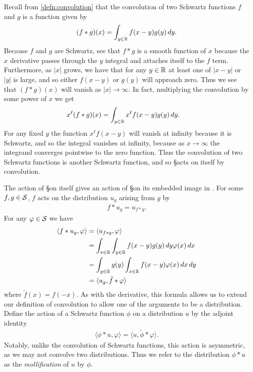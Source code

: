     Recall from \cref{defn:convolution} that the convolution of two Schwartz functions $f$ and $g$ is a function given by
    \begin{align*}
      (f*g)(x) = \int_{y\in\R} f(x-y)g(y)\,dy \text{.}
    \end{align*}
    Because $f$ and $g$ are Schwartz, see that $f*g$ is a smooth function of $x$ because the $x$ derivative passes through the $y$ integral and attaches itself to the $f$ term.
    Furthermore, as $|x|$ grows, we have that for any $y\in\R$ at least one of $|x-y|$ or $|y|$ is large, and so either $f(x-y)$ or $g(y)$ will approach zero.
    Thus we see that $(f*g)(x)$ will vanish as $|x|\rightarrow\infty$.
    In fact, multiplying the convolution by some power of $x$ we get
    \begin{align*}
      x^\ell(f*g)(x)
      &= \int_{y\in\R} x^\ell f(x-y)g(y)\,dy \text{.}
    \end{align*}
    For any fixed $y$ the function $x^\ell f(x-y)$ will vanish at infinity because it is Schwartz, and so the integral vanishes at infinity, because as $x\rightarrow\infty$ the integrand converges pointwise to the zero function.
    Thus the convolution of two Schwartz functions is another Schwartz function, and so \S acts on itself by convolution.

    The action of \S on itself gives an action of \S on its embedded image in \SS.
    For some $f,g\in\S$, $f$ acts on the distribution $u_g$ arising from $g$ by
    \begin{align*}
      f*u_g = u_{f*g} \text{.}
    \end{align*}
    For any $\varphi\in\S$ we have
    \begin{align*}
      \langle f*u_g, \varphi\rangle
      &= \langle u_{f*g}, \varphi\rangle
      \\&= \int_{x\in\R} \int_{y\in\R} f(x-y)g(y)\,dy \varphi(x)\,dx
      \\&= \int_{y\in\R} g(y) \int_{x\in\R} f(x-y)\varphi(x)\,dx\,dy
      \\&= \langle u_g, \tilde f*\varphi\rangle
    \end{align*}
    where $\tilde f(x) = f(-x)$.
    As with the derivative, this formula allows us to extend our definition of convolution to allow one of the arguments to be a distribution.
    Define the action of a Schwartz function $\phi$ on a distribution $u$ by the adjoint identity
    \begin{align*}
      \langle \phi*u, \varphi\rangle
      = \langle u, \tilde\phi*\varphi\rangle \text{.}
    \end{align*}
    Notably, unlike the convolution of Schwartz functions, this action is asymmetric, as we may not convolve two distributions.
    Thus we refer to the distribution $\phi*u$ as the \emph{mollification} of $u$ by $\phi$.

